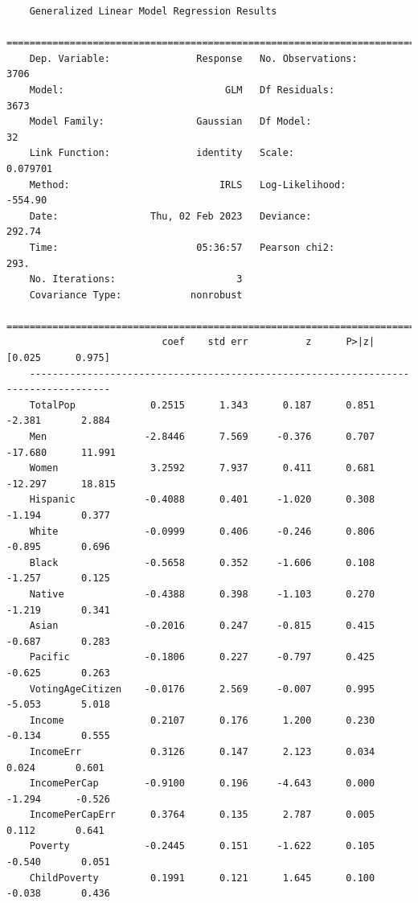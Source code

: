 \documentclass[14pt, a4paper]{article}
\numberwithin{equation}{section}
\numberwithin{figure}{section}
\numberwithin{dl}{section}
\numberwithin{md}{section}
\numberwithin{bd}{section}
\numberwithin{dn}{section}
\numberwithin{hq}{section}
\begin{document}
    \begin{verbatim}
    Generalized Linear Model Regression Results                  
    ==============================================================================
    Dep. Variable:               Response   No. Observations:                 3706
    Model:                            GLM   Df Residuals:                     3673
    Model Family:                Gaussian   Df Model:                           32
    Link Function:               identity   Scale:                        0.079701
    Method:                          IRLS   Log-Likelihood:                -554.90
    Date:                Thu, 02 Feb 2023   Deviance:                       292.74
    Time:                        05:36:57   Pearson chi2:                     293.
    No. Iterations:                     3                                         
    Covariance Type:            nonrobust                                         
    ====================================================================================
                           coef    std err          z      P>|z|      [0.025      0.975]
    ------------------------------------------------------------------------------------
    TotalPop             0.2515      1.343      0.187      0.851      -2.381       2.884
    Men                 -2.8446      7.569     -0.376      0.707     -17.680      11.991
    Women                3.2592      7.937      0.411      0.681     -12.297      18.815
    Hispanic            -0.4088      0.401     -1.020      0.308      -1.194       0.377
    White               -0.0999      0.406     -0.246      0.806      -0.895       0.696
    Black               -0.5658      0.352     -1.606      0.108      -1.257       0.125
    Native              -0.4388      0.398     -1.103      0.270      -1.219       0.341
    Asian               -0.2016      0.247     -0.815      0.415      -0.687       0.283
    Pacific             -0.1806      0.227     -0.797      0.425      -0.625       0.263
    VotingAgeCitizen    -0.0176      2.569     -0.007      0.995      -5.053       5.018
    Income               0.2107      0.176      1.200      0.230      -0.134       0.555
    IncomeErr            0.3126      0.147      2.123      0.034       0.024       0.601
    IncomePerCap        -0.9100      0.196     -4.643      0.000      -1.294      -0.526
    IncomePerCapErr      0.3764      0.135      2.787      0.005       0.112       0.641
    Poverty             -0.2445      0.151     -1.622      0.105      -0.540       0.051
    ChildPoverty         0.1991      0.121      1.645      0.100      -0.038       0.436

\end{verbatim}
\end{document}
